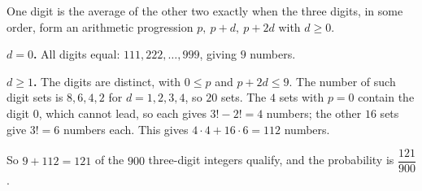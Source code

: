 One digit is the average of the other two exactly when the three digits, in some order, form an arithmetic progression $p,\ p+d,\ p+2d$ with $d\ge0$.

\textbf{$d=0$.} All digits equal: $111,222,\ldots,999$, giving $9$ numbers.

\textbf{$d\ge1$.} The digits are distinct, with $0\le p$ and $p+2d\le9$. The number of such digit sets is $8,6,4,2$ for $d=1,2,3,4$, so $20$ sets. The $4$ sets with $p=0$ contain the digit $0$, which cannot lead, so each gives $3!-2!=4$ numbers; the other $16$ sets give $3!=6$ numbers each. This gives $4\cdot4+16\cdot6=112$ numbers.

So $9+112=121$ of the $900$ three-digit integers qualify, and the probability is $\boxed{\dfrac{121}{900}}$.
